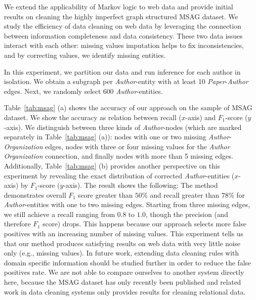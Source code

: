 We extend the applicability of Markov logic to web data and provide initial results on cleaning the highly imperfect graph structured \textsc{MSAG} dataset. We study the efficiency of data cleaning on web data by leveraging the connection between information completeness and data consistency. These two data issues interact with each other: missing values imputation helps to fix inconsistencies, and by correcting values, we identify missing entities. 

In this experiment, we partition our data and run inference for each author in isolation. We obtain a subgraph per \textit{Author}-entity with at least 10 \textit{Paper}-\textit{Author} edges. Next, we randomly select 600 \textit{Author}-entities. 

Table~\ref{tab:msag} (a) shows the accuracy of our approach on the sample of \textsc{MSAG} dataset. We show the accuracy as relation between recall ($x$-axis) and $F_1$-score ($y$-axis). We distinguish between three kinds of \textit{Author}-nodes (which are marked separately in Table~\ref{tab:msag} (a)): 
nodes with one or two missing \textit{Author}-\textit{Organization} edges, nodes with three or four missing values for the \textit{Author} \textit{Organization} connection, and finally nodes with more than 5 missing edges. Additionally, Table~\ref{tab:msag} (b) provides another perspective on this experiment by revealing the exact distribution of corrected \textit{Author}-entities ($x$-axis) by $F_1$-score ($y$-axis). The result shows the following: The method demonstrates overall $F_1$ score greater than $50\%$ and recall greater than $78\%$ for \textit{Author}-entities with one to two missing edges. Starting from three missing edges, we still achieve a recall ranging from $0.8$ to $1.0$, though the precision (and therefore $F_1$ score) drops. This happens because our approach selects more false positives with an increasing number of missing values. This experiment tells us that our method produces satisfying results on web data with very little noise only (e.g., missing values). In future work, extending data cleaning rules with domain specific information should be studied further in order to reduce the false positives rate. We are not able to compare ourselves to another system directly here, because the \textsc{MSAG} dataset has only recently been published and related work in data cleaning systems only provides results for cleaning relational data.

